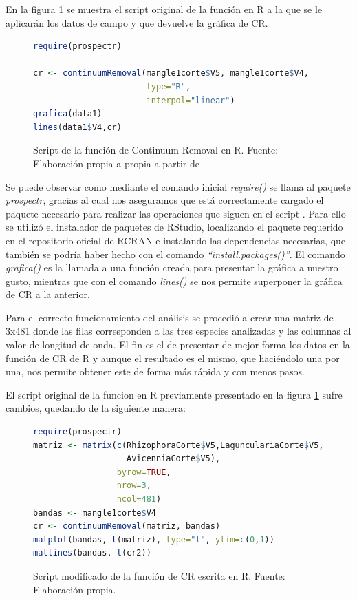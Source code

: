 En la figura \ref{fig:CR} se muestra el script original de la función en R a la que se le aplicarán los datos de campo y que devuelve la gráfica de \ac{CR}.\Sep

\begin{figure}
\centering
\begin{lstlisting}[language = R, frame = single]
require(prospectr)

cr <- continuumRemoval(mangle1corte$V5, mangle1corte$V4,
                       type="R",
                       interpol="linear")
grafica(data1)
lines(data1$V4,cr)
\end{lstlisting}
\caption[Función de Continuum Removal]{Script de la función de Continuum Removal en R. Fuente: Elaboración propia a propia a partir de \cite{stevens2014introduction}.}
\label{fig:CR}
\end{figure}

Se puede observar como mediante el comando inicial \textit{require()} se llama al paquete \textit{prospectr}, gracias al cual nos aseguramos que está correctamente cargado el paquete necesario para realizar las operaciones que siguen en el script \citep{stevens2014introduction}. Para ello se utilizó el instalador de paquetes de RStudio, localizando el paquete requerido en el repositorio oficial de RCRAN e instalando las dependencias necesarias, que también se podría haber hecho con el comando \textit{``install.packages()''}. El comando \textit{grafica()} es la llamada a una función creada para presentar la gráfica a nuestro gusto, mientras que con el comando \textit{lines()} se nos permite superponer la gráfica de \ac{CR} a la anterior.\Sep

Para el correcto funcionamiento del análisis se procedió a crear una matriz de 3x481 donde las filas corresponden a las tres especies analizadas y las columnas al valor de longitud de onda. El fin es el de presentar de mejor forma los datos en la función de \ac{CR} de R y aunque el resultado es el mismo, que haciéndolo una por una, nos permite obtener este de forma más rápida y con menos pasos.\Sep

El script original de la funcion en R previamente presentado en la figura \ref{fig:CR} sufre cambios, quedando de la siguiente manera:\SmallSep

\begin{figure}[ht]
	\centering
	\begin{lstlisting}[language = R, frame = single]
require(prospectr)
matriz <- matrix(c(RhizophoraCorte$V5,LagunculariaCorte$V5,
                   AvicenniaCorte$V5),
                 byrow=TRUE,
                 nrow=3,
                 ncol=481)
bandas <- mangle1corte$V4
cr <- continuumRemoval(matriz, bandas)
matplot(bandas, t(matriz), type="l", ylim=c(0,1))
matlines(bandas, t(cr2))
	\end{lstlisting}
	\caption[Función modificada de CR]{Script modificado de la función de CR escrita en R. Fuente: Elaboración propia.}
	\label{fig:CRmodificado}
\end{figure}	

